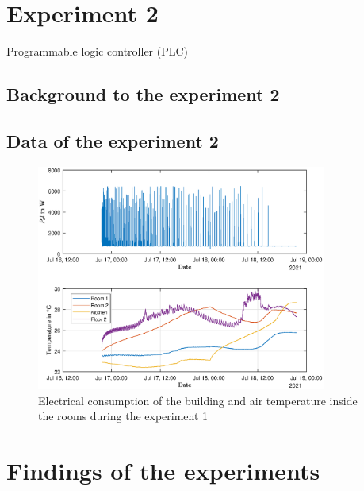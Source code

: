 \section{Experiment 2}
\label{sec:Experiment2}
Programmable logic controller (PLC)

\subsection{Background to the experiment 2}
\label{subsec:Backgroud to experiment 2}

\subsection{Data of the experiment 2}
\label{subsec:Data of the experiment 2}
\begin{figure}
            \centering
            \includegraphics[width=0.85\textwidth]{figure/P_el_trainingsdaten_latex.eps}
           \caption{Electrical consumption of the building and air temperature inside the rooms during the experiment 1}
           \label{fig:P_elTemperatureExperiment1}
    \end{figure}
\section{Findings of the experiments}
\label{sec:findings of the experiments}
